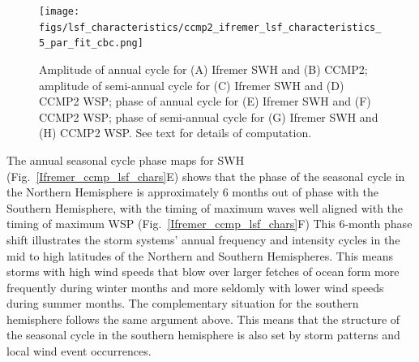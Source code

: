 \documentclass[draft,linenumbers]{agujournal2018}
\begin{document}
\begin{figure}[tbh]
\centering
\texttt{[image: figs/lsf\_characteristics/ccmp2\_ifremer\_lsf\_characteristics\_5\_par\_fit\_cbc.png]}
\caption{Amplitude of annual cycle for (A) Ifremer SWH and (B) CCMP2; amplitude of semi-annual cycle for (C) Ifremer SWH and (D) CCMP2 WSP; phase of annual cycle for (E) Ifremer SWH and (F) CCMP2 WSP; phase of semi-annual cycle for (G) Ifremer SWH and (H) CCMP2 WSP.  See text for details of computation.}
\label{Ifremer_ccmp2_lsf_chars}
\end{figure}

The annual seasonal cycle phase maps for SWH (Fig.~\ref{Ifremer_ccmp_lsf_chars}E) shows that the phase of the seasonal cycle in the Northern Hemisphere is approximately 6 months out of phase with the Southern Hemisphere, with the timing of maximum waves well aligned with the timing of maximum WSP (Fig.~\ref{Ifremer_ccmp_lsf_chars}F)  This 6-month phase shift illustrates the storm systems' annual frequency and intensity cycles in the mid to high latitudes of the Northern and Southern Hemispheres. This means storms with high wind speeds that blow over larger fetches of ocean form more frequently during winter months and more seldomly with lower wind speeds during summer months. The complementary situation for the southern hemisphere follows the same argument above. This means that the structure of the seasonal cycle in the southern hemisphere is also set by storm patterns and local wind event occurrences. 



\end{document}
